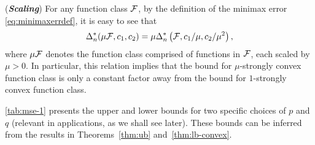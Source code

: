 \begin{remark}(\textbf{\textit{Scaling}})
For any function class $\mathcal{F}$, by the definition of the minimax error \eqref{eq:minimaxerrdef}, it is easy to see that
$$\Delta_n^*(\mu \mathcal{F}, c_1,c_2) = \mu \Delta_n^*\left(\mathcal{F}, c_1/\mu,c_2/\mu^2\right),$$
 where $\mu \mathcal{F}$ denotes the function class comprised of functions in $\mathcal{F}$, each scaled by $\mu>0$. In particular, this relation implies that the bound for $\mu$-strongly convex function class is only a constant factor away from the bound for $1$-strongly convex function class.
\end{remark}

\cref{tab:mse-1} presents the upper and lower bounds for two specific choices of $p$ and $q$ (relevant in applications, as we shall see later). These bounds can be inferred from the results in Theorems~\ref{thm:ub} and~\ref{thm:lb-convex}.

